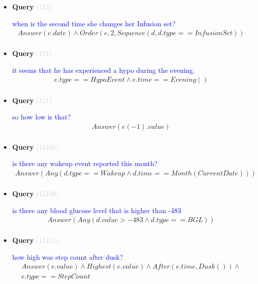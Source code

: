 \documentclass[11pt]{article}
\newcommand{\key}[1]{\textcolor{lightgray}{#1}}
\newcounter{CQuery}
\begin{document}
\begin{itemize}
\item
\textbf{Query\theCQuery} \key{(112)} \addtocounter{CQuery}{1}
\textcolor{blue}{ when is the second time she changes her Infusion set? }
\begin{multline*}
Answer(e.date) \wedge Order(e, 2, Sequence(d, d.type==InfusionSet)) \\ 
\end{multline*}


\item
\textbf{Query\theCQuery} \key{(121)} \addtocounter{CQuery}{1}
\textcolor{blue}{ it seems that he has experienced a hypo during the evening. }
\begin{multline*}
e.type==HypoEvent \wedge e.time==Evening() \\ 
\end{multline*}


\item
\textbf{Query\theCQuery} \key{(121)} \addtocounter{CQuery}{1}
\textcolor{blue}{ so how low is that? }
\begin{multline*}
Answer(e(-1).value) \\ 
\end{multline*}


\item
\textbf{Query\theCQuery} \key{(11101)} \addtocounter{CQuery}{1}
\textcolor{blue}{ is there any wakeup event reported this month? }
\begin{multline*}
Answer(Any(d.type==Wakeup \wedge d.time==Month(CurrentDate))) \\ 
\end{multline*}


\item
\textbf{Query\theCQuery} \key{(11100)} \addtocounter{CQuery}{1}
\textcolor{blue}{ is there any blood glucose level that is higher than -483 }
\begin{multline*}
Answer(Any(d.value>-483 \wedge d.type==BGL)) \\ 
\end{multline*}


\item
\textbf{Query\theCQuery} \key{(11111)} \addtocounter{CQuery}{1}
\textcolor{blue}{ how high was step count after dusk? }
\begin{multline*}
Answer(e.value) \wedge Highest(e.value) \wedge After(e.time, Dusk()) \wedge \\ 
e.type==StepCount \\ 
\end{multline*}



\end{itemize}
\end{document}
